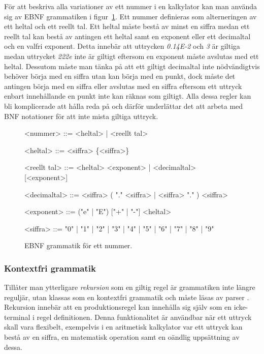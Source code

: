 För att beskriva alla variationer av ett nummer i en kalkylator kan man
använda sig av EBNF grammatiken i figur~\ref{fig:reg}. Ett nummer definieras
som alterneringen av ett heltal och ett reellt tal. Ett
heltal måste bestå av minst en siffra medan ett reellt tal kan bestå
av antingen ett heltal samt en exponent eller ett decimaltal och en valfri
exponent. Detta innebär att uttrycken \textit{0.14E-2} och \textit{3} är
giltiga medan uttrycket \textit{222e} inte är giltigt eftersom en exponent
måste avslutas med ett heltal. Dessutom måste man tänka på att ett giltigt
decimaltal inte nödvändigtvis behöver börja med en siffra utan kan börja med
en punkt, dock måste det antingen börja med en siffra eller avslutas med en
siffra eftersom ett uttryck enbart innehållande en punkt inte kan räknas som
giltigt. Alla dessa regler kan bli komplicerade att hålla reda på och därför
underlättar det att arbeta med BNF notationer för att inte mista giltiga
uttryck.

\begin{figure}[ht]
  \begin{grammar}
    \singlespace\small%
    \selectfont

    <nummer> ::= <heltal> | <reellt tal>

    <heltal> ::= <siffra> \{<siffra>\}

    <reellt tal> ::= <heltal> <exponent> | <decimaltal> [<exponent>]

    <decimaltal> ::= { <siffra> } ( "." <siffra> | <siffra> "." ) { <siffra> }

    <exponent> ::= ("e" | "E") ["+" | "-"] <heltal>

    <siffra> ::= "0" | "1" | "2" | "3" | "4" | "5" | "6" | "7" | "8" | "9"

  \end{grammar}
  \caption{EBNF grammatik för ett nummer.}
  \label{fig:reg}
\end{figure}

\subsubsection{Kontextfri grammatik}

Tillåter man ytterligare \textit{rekursion} som en giltig regel är grammatiken
inte längre reguljär, utan klassas som en kontextfri grammatik och måste
läsas av parser \citep[s. 100]{sm09}. Rekursion innebär att en produktionsregel kan innehålla sig
själv som en icke-terminal i regel definitionen. Denna funktionalitet är
användbar när ett uttryck skall vara flexibelt, exempelvis i en aritmetisk
kalkylator var ett uttryck kan bestå av en siffra, en matematisk operation
samt en oändlig uppsättning av dessa.

